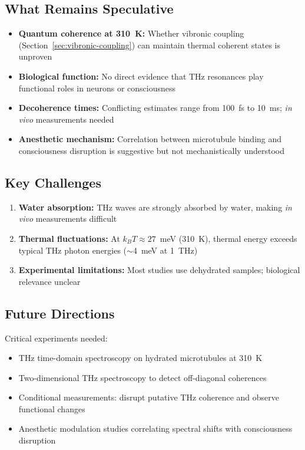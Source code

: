 \subsection{What Remains Speculative}

\begin{itemize}
\item \textbf{Quantum coherence at 310~K:} Whether vibronic coupling (Section~\ref{sec:vibronic-coupling}) can maintain thermal coherent states is unproven
\item \textbf{Biological function:} No direct evidence that THz resonances play functional roles in neurons or consciousness
\item \textbf{Decoherence times:} Conflicting estimates range from 100~fs to 10~ms; \textit{in vivo} measurements needed
\item \textbf{Anesthetic mechanism:} Correlation between microtubule binding and consciousness disruption is suggestive but not mechanistically understood
\end{itemize}

\subsection{Key Challenges}

\begin{enumerate}
\item \textbf{Water absorption:} THz waves are strongly absorbed by water, making \textit{in vivo} measurements difficult
\item \textbf{Thermal fluctuations:} At $k_B T \approx 27$~meV (310~K), thermal energy exceeds typical THz photon energies ($\sim$4~meV at 1~THz)
\item \textbf{Experimental limitations:} Most studies use dehydrated samples; biological relevance unclear
\end{enumerate}

\subsection{Future Directions}

Critical experiments needed:
\begin{itemize}
\item THz time-domain spectroscopy on hydrated microtubules at 310~K
\item Two-dimensional THz spectroscopy to detect off-diagonal coherences
\item Conditional measurements: disrupt putative THz coherence and observe functional changes
\item Anesthetic modulation studies correlating spectral shifts with consciousness disruption
\end{itemize}

